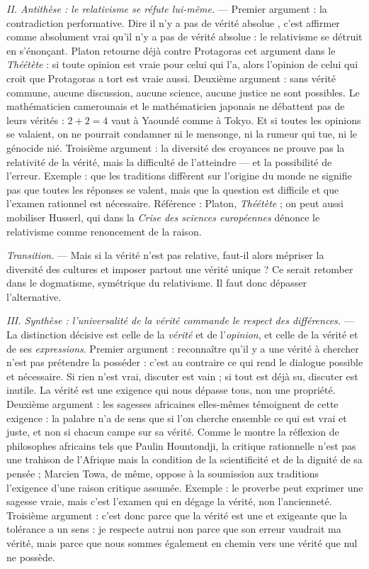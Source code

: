 \documentclass[11pt]{article}
\begin{document}
\begin{corrige}
\emph{II. Antithèse : le relativisme se réfute lui-même.} --- Premier argument : la contradiction performative. Dire \guillemotleft il n'y a pas de vérité absolue \guillemotright, c'est affirmer comme absolument vrai qu'il n'y a pas de vérité absolue : le relativisme se détruit en s'énonçant. Platon retourne déjà contre Protagoras cet argument dans le \emph{Théétète} : si toute opinion est vraie pour celui qui l'a, alors l'opinion de celui qui croit que Protagoras a tort est vraie aussi. Deuxième argument : sans vérité commune, aucune discussion, aucune science, aucune justice ne sont possibles. Le mathématicien camerounais et le mathématicien japonais ne débattent pas de \guillemotleft leurs \guillemotright vérités : $2+2=4$ vaut à Yaoundé comme à Tokyo. Et si toutes les opinions se valaient, on ne pourrait condamner ni le mensonge, ni la rumeur qui tue, ni le génocide nié. Troisième argument : la diversité des croyances ne prouve pas la relativité de la vérité, mais la difficulté de l'atteindre --- et la possibilité de l'erreur. Exemple : que les traditions diffèrent sur l'origine du monde ne signifie pas que toutes les réponses se valent, mais que la question est difficile et que l'examen rationnel est nécessaire. Référence : Platon, \emph{Théétète} ; on peut aussi mobiliser Husserl, qui dans la \emph{Crise des sciences européennes} dénonce le relativisme comme renoncement de la raison.

\emph{Transition.} --- Mais si la vérité n'est pas relative, faut-il alors mépriser la diversité des cultures et imposer partout une vérité unique ? Ce serait retomber dans le dogmatisme, symétrique du relativisme. Il faut donc dépasser l'alternative.

\emph{III. Synthèse : l'universalité de la vérité commande le respect des différences.} --- La distinction décisive est celle de la \emph{vérité} et de l'\emph{opinion}, et celle de la vérité et de ses \emph{expressions}. Premier argument : reconnaître qu'il y a une vérité à chercher n'est pas prétendre la posséder : c'est au contraire ce qui rend le dialogue possible et nécessaire. Si rien n'est vrai, discuter est vain ; si tout est déjà su, discuter est inutile. La vérité est une exigence qui nous dépasse tous, non une propriété. Deuxième argument : les sagesses africaines elles-mêmes témoignent de cette exigence : la palabre n'a de sens que si l'on cherche ensemble ce qui est vrai et juste, et non si chacun campe sur \guillemotleft sa \guillemotright vérité. Comme le montre la réflexion de philosophes africains tels que Paulin Hountondji, la critique rationnelle n'est pas une trahison de l'Afrique mais la condition de la scientificité et de la dignité de sa pensée ; Marcien Towa, de même, oppose à la soumission aux traditions l'exigence d'une raison critique assumée. Exemple : le proverbe peut exprimer une sagesse vraie, mais c'est l'examen qui en dégage la vérité, non l'ancienneté. Troisième argument : c'est donc parce que la vérité est une et exigeante que la tolérance a un sens : je respecte autrui non parce que son erreur vaudrait ma vérité, mais parce que nous sommes également en chemin vers une vérité que nul ne possède.


\end{corrige}
\end{document}
